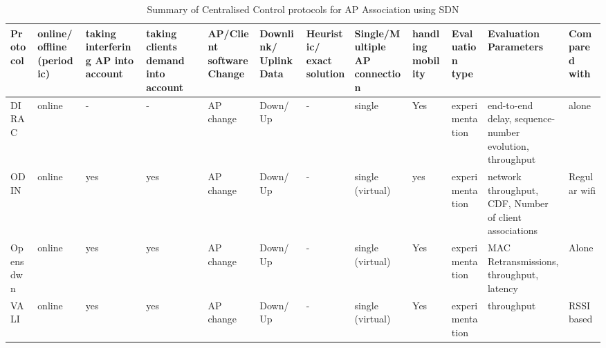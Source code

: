 \documentclass[journal,transmag]{IEEEtran}
\begin{document}
\begin{table}
\centering\caption{Summary of Centralised Control protocols for AP Association using SDN\label{TAB:centralised_SDN_works_association}}
\begin{tabular} {|p{}|p{.7cm} |p{.9cm}|p{.7cm}|p{.9cm}|p{.6cm}|p{}|p{}|p{} |p{1.7cm}|p{}|p{}|}
\hline
\cellcolor{xy}\scriptsize{Protocol} & \cellcolor{xy}\scriptsize{online/ offline (periodic)} & \cellcolor{xy}\scriptsize{taking interfering AP into account} & \cellcolor{xy}\scriptsize{taking clients demand into account} & \cellcolor{xy}\scriptsize{AP/Client software Change} & \cellcolor{xy} \scriptsize{Downlink/ Uplink Data} & \cellcolor{xy} \scriptsize{Heuristic/ exact solution} & \cellcolor{xy} \scriptsize{Single/Multiple AP connection} & \cellcolor{xy} \scriptsize{handling mobility} & \cellcolor{xy}\scriptsize{Evaluation type} & \cellcolor{xy}\scriptsize{Evaluation Parameters} & \cellcolor{xy}\scriptsize{Compared with} \\\hline\hline

\scriptsize{DIRAC \cite{05DIRAC}} &\scriptsize{online} &\scriptsize{-} &\scriptsize{-} &\scriptsize{AP change} &\scriptsize{Down/ Up} &\scriptsize{-} &\scriptsize{single} &\scriptsize{Yes}  &\scriptsize{experimentation} &\scriptsize{end-to-end delay, sequence-number evolution, throughput} &\scriptsize{alone} \\\hline

\scriptsize{ODIN \cite{14Odin:Programmatic_Orchestration_WiFi}} &\scriptsize{online} &\scriptsize{yes} &\scriptsize{yes} &\scriptsize{AP change} &\scriptsize{Down/ Up} &\scriptsize{-} &\scriptsize{single (virtual)} &\scriptsize{yes} &\scriptsize{experimentation} &\scriptsize{network throughput, CDF, Number of client associations} &\scriptsize{Regular wifi} \\\hline

\scriptsize{Opensdwn \cite{15OpenSDWN_home_entreprise_WIFI}} &\scriptsize{online} &\scriptsize{yes} &\scriptsize{yes} &\scriptsize{AP change} &\scriptsize{Down/ Up} &\scriptsize{-} &\scriptsize{single (virtual)} &\scriptsize{Yes} &\scriptsize{experimentation} &\scriptsize{MAC Retransmissions, throughput, latency} &\scriptsize{Alone} \\\hline 

\scriptsize{VALI \cite{16VALI_SDN}} &\scriptsize{online} &\scriptsize{yes} &\scriptsize{yes} &\scriptsize{AP change} &\scriptsize{Down/ Up} &\scriptsize{-} &\scriptsize{single (virtual)} &\scriptsize{Yes} &\scriptsize{experimentation} &\scriptsize{throughput} &\scriptsize{RSSI based} \\\hline


\end{tabular}
\end{table}
\end{document}
